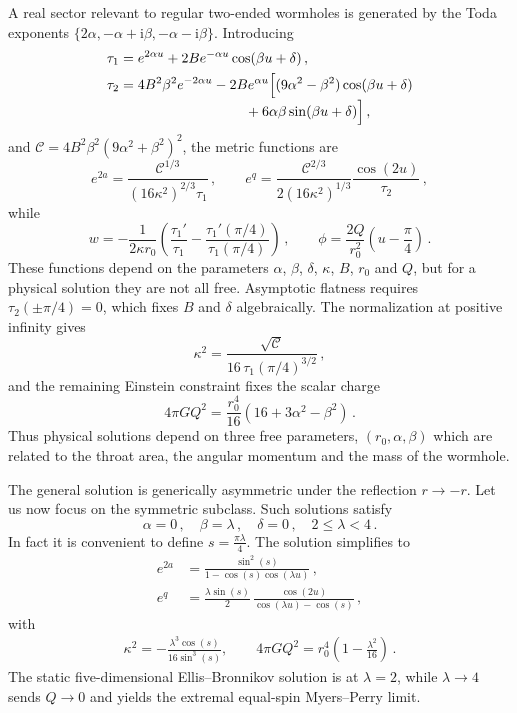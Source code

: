 \documentclass[aps,prl,reprint,superscriptaddress,nofootinbib,floatfix]{revtex4-2}
\newcommand{\ii}{\mathrm i}
\newcommand{\rr}{r_0}
\newcommand{\kap}{\kappa}
\begin{document}
A real sector relevant to regular two-ended wormholes is generated by the Toda
exponents
$\{2\alpha,-\alpha+\ii\beta,-\alpha-\ii\beta\}$.  
Introducing
\begin{align}
 \tau_1={}&e^{2\alpha u}+2B e^{-\alpha u}\cos(\beta u+\delta)\,,\\
 \tau_2={}&4B^2\beta^2e^{-2\alpha u}
 -2Be^{\alpha u}\Big[(9\alpha^2-\beta^2)\cos(\beta u+\delta)
 \nonumber\\[-1mm]
 &\hspace{27mm}+6\alpha\beta\sin(\beta u+\delta)\Big]\,,
 \label{eq:taus}
\end{align}
and
$\mathcal C=4B^2\beta^2(9\alpha^2+\beta^2)^2$, the metric functions are
\begin{equation}
 e^{2a}=\frac{\mathcal C^{1/3}}
 {(16\kap^2)^{2/3}\tau_1} \,,\qquad
 e^q=\frac{\mathcal C^{2/3}}{2(16\kap^2)^{1/3}}
 \frac{\cos(2u)}{\tau_2} \,,
 \label{eq:generalmetric}
\end{equation}
while
\begin{equation}
 w
 =-\frac{1}{2\kap\rr}
 \left(\frac{\tau_1'}{\tau_1}
 -\frac{\tau_1'(\pi/4)}{\tau_1(\pi/4)}\right) \,,\qquad
 \phi=\frac{2Q}{\rr^2}\left(u-\frac{\pi}{4}\right) \,.
 \label{eq:omegaphi}
\end{equation}
These functions depend on the parameters $\alpha$, $\beta$, $\delta$, $\kappa$, $B$, $r_0$ and $Q$, but for a physical solution they are not all free.
Asymptotic flatness requires $\tau_2(\pm\pi/4)=0$, which fixes $B$ and $\delta$ algebraically.
The normalization at
positive infinity gives
\begin{equation}
\kap^2=\frac{\sqrt{\mathcal C}} {16\,\tau_1(\pi/4)^{3/2}} \,,
\end{equation}
and the remaining Einstein constraint fixes the scalar charge
\begin{equation}
 4\pi GQ^2=\frac{\rr^4}{16}(16+3\alpha^2-\beta^2) \,.
 \label{eq:Qgeneral}
\end{equation}
Thus physical solutions depend on three free parameters, $(\rr,\alpha,\beta)$
which are related to the throat area, the angular momentum and the mass of the wormhole.

The general solution is generically asymmetric under the reflection $r\to -r$. Let us now focus on the symmetric subclass. Such solutions satisfy
\begin{equation}
\alpha=0\,,\quad \beta=\lambda\,, \quad\delta = 0 \,,\quad 2\leq\lambda<4 \,.
\end{equation}
In fact it is convenient to define $s=\frac{\pi\lambda}{4}$.%
The solution simplifies to
\begin{align}
 e^{2a}&=\frac{\sin^2(s)}{1-\cos(s)\cos(\lambda u)}\,,\\
 e^q&=\frac{\lambda\sin(s)}{2}\,
 \frac{\cos(2u)}{\cos(\lambda u)-\cos(s)}\,,
\end{align}
with
\begin{align}
 \kap^2=-\frac{\lambda^3\cos(s)}{16\sin^3(s)},\qquad
 4\pi GQ^2=\rr^4\left(1-\frac{\lambda^2}{16}\right)\,.
\end{align}
The static five-dimensional Ellis--Bronnikov solution is at 
$\lambda=2$,
while $\lambda\rightarrow4$ sends $Q\rightarrow0$ and yields the extremal equal-spin Myers--Perry limit. 
\end{document}
